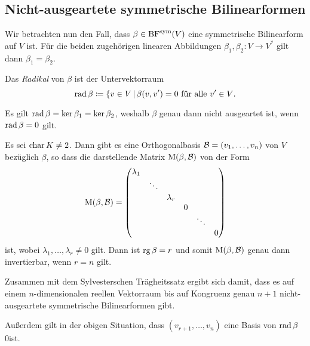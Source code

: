 \subsection{Nicht-ausgeartete symmetrische Bilinearformen}

Wir betrachten nun den Fall, dass $\beta \in \operatorname{BF}^{\operatorname{sym}}(V)$ eine symmetrische Bilinearform auf $V$ ist.
Für die beiden zugehörigen linearen Abbildungen $\beta_1, \beta_2 \colon V \to V^*$ gilt dann $\beta_1 = \beta_2$.

\begin{definition}
  Das \emph{Radikal} von $\beta$ ist der Untervektorraum
  \[
              \operatorname{rad} \beta
    \coloneqq \{v \in V \,|\, \text{$\beta(v,v') = 0$ für alle $v' \in V$}.
  \]
\end{definition}

Es gilt $\operatorname{rad} \beta = \ker \beta_1 = \ker \beta_2$, weshalb $\beta$ genau dann nicht ausgeartet ist, wenn $\operatorname{rad} \beta = 0$ gilt.

\begin{example}
  Es sei $\operatorname{char} K \neq 2$.
  Dann gibt es eine Orthogonalbasis $\mathcal{B} = (v_1, \dotsc, v_n)$ von $V$ bezüglich $\beta$, so dass die darstellende Matrix $\operatorname{M}(\beta, \mathcal{B})$ von der Form
  \[
      \operatorname{M}(\beta, \mathcal{B})
    = \begin{pmatrix}
        \lambda_1 &         &           &   &         &   \\
                  & \ddots  &           &   &         &   \\
                  &         & \lambda_r &   &         &   \\
                  &         &           & 0 &         &   \\
                  &         &           &   & \ddots  &   \\
                  &         &           &   &         & 0
      \end{pmatrix}
  \]
  ist, wobei $\lambda_1, \dotsc, \lambda_r \neq 0$ gilt.
  Dann ist $\operatorname{rg} \beta = r$ und somit $\operatorname{M}(\beta, \mathcal{B})$ genau dann invertierbar, wenn $r = n$ gilt.
  
  Zusammen mit dem Sylvesterschen Trägheitssatz ergibt sich damit, dass es auf einem $n$-dimensionalen reellen Vektorraum bis auf Kongruenz genau $n+1$ nicht-ausgeartete symmetrische Bilinearformen gibt.
  
  Außerdem gilt in der obigen Situation, dass $(v_{r+1}, \dotsc, v_n)$ eine Basis von $\operatorname{rad} \beta$0ist.
\end{example}


